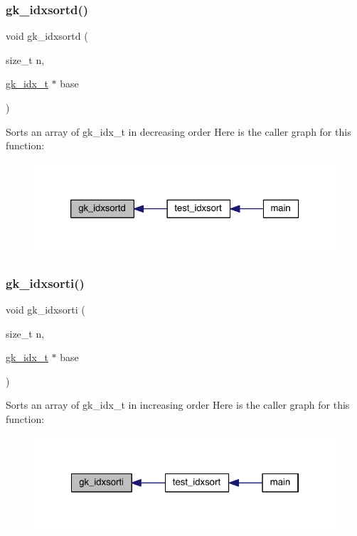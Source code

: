 \subsubsection{\texorpdfstring{gk\+\_\+idxsortd()}{gk\_idxsortd()}}
{\footnotesize\ttfamily void gk\+\_\+idxsortd (\begin{DoxyParamCaption}\item[{size\+\_\+t}]{n,  }\item[{\hyperlink{a00083_a899f9d8c47b1ca0c2fead41097f4bde2}{gk\+\_\+idx\+\_\+t} $\ast$}]{base }\end{DoxyParamCaption})}

Sorts an array of gk\+\_\+idx\+\_\+t in decreasing order Here is the caller graph for this function\+:\nopagebreak
\begin{figure}[H]
\begin{center}
\leavevmode
\includegraphics[width=326pt]{a00140_a851c55670d9c95d34c588eb086626e6d_icgraph}
\end{center}
\end{figure}
\mbox{\label{a00140_a53b782afd9dd6604c6e8a035c7e1de46}} 
\subsubsection{\texorpdfstring{gk\+\_\+idxsorti()}{gk\_idxsorti()}}
{\footnotesize\ttfamily void gk\+\_\+idxsorti (\begin{DoxyParamCaption}\item[{size\+\_\+t}]{n,  }\item[{\hyperlink{a00083_a899f9d8c47b1ca0c2fead41097f4bde2}{gk\+\_\+idx\+\_\+t} $\ast$}]{base }\end{DoxyParamCaption})}

Sorts an array of gk\+\_\+idx\+\_\+t in increasing order Here is the caller graph for this function\+:\nopagebreak
\begin{figure}[H]
\begin{center}
\leavevmode
\includegraphics[width=322pt]{a00140_a53b782afd9dd6604c6e8a035c7e1de46_icgraph}
\end{center}
\end{figure}
\mbox{\label{a00140_a0fde2ad2770975c122bab802cbd5094b}} 
